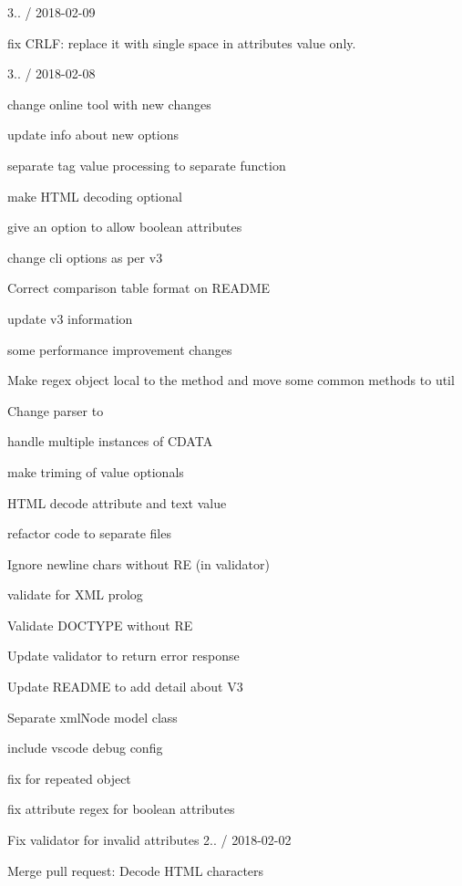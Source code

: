 3.. / 2018-\/02-\/09
\begin{DoxyItemize}
\item fix CRLF\+: replace it with single space in attributes value only.
\end{DoxyItemize}

3.. / 2018-\/02-\/08
\begin{DoxyItemize}
\item change online tool with new changes
\item update info about new options
\item separate tag value processing to separate function
\item make HTML decoding optional
\item give an option to allow boolean attributes
\item change cli options as per v3
\item Correct comparison table format on README
\item update v3 information
\item some performance improvement changes
\item Make regex object local to the method and move some common methods to util
\item Change parser to
\begin{DoxyItemize}
\item handle multiple instances of CDATA
\item make triming of value optionals
\item HTML decode attribute and text value
\item refactor code to separate files
\end{DoxyItemize}
\item Ignore newline chars without RE (in validator)
\item validate for XML prolog
\item Validate DOCTYPE without RE
\item Update validator to return error response
\item Update README to add detail about V3
\item Separate xml\+Node model class
\item include vscode debug config
\item fix for repeated object
\item fix attribute regex for boolean attributes
\item Fix validator for invalid attributes 2.. / 2018-\/02-\/02
\item Merge pull request\+: Decode HTML characters

\end{DoxyItemize}
